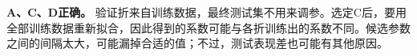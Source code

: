 \textbf{A、C、D正确。} 验证折来自训练数据，最终测试集不用来调参。选定C后，要用全部训练数据重新拟合，因此得到的系数可能与各折训练出的系数不同。候选参数之间的间隔太大，可能漏掉合适的值；不过，测试表现差也可能有其他原因。
